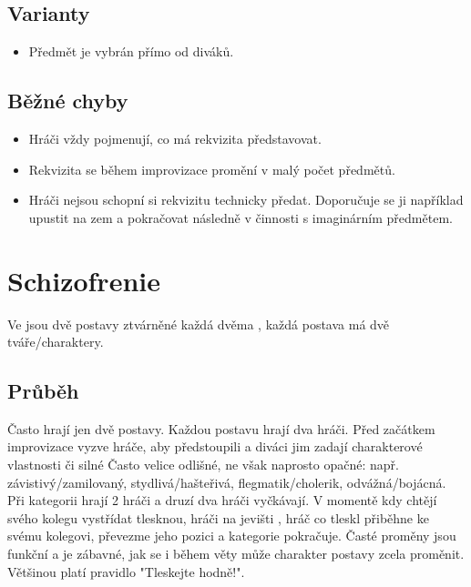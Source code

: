 \subsection{ Varianty } \begin{itemize}
\item Předmět je vybrán přímo od diváků.
\end{itemize}
 
\subsection{ Běžné chyby } \begin{itemize}
\item Hráči vždy pojmenují, co má rekvizita představovat.
\item Rekvizita se během improvizace promění v malý počet předmětů.
\item Hráči nejsou schopní si rekvizitu technicky předat. Doporučuje se ji například upustit na zem a pokračovat následně v činnosti s imaginárním předmětem.
\end{itemize}
 
 
 
 
\needspace{5cm} \section{Schizofrenie} \label{schizofrenie}  
 
Ve  jsou dvě postavy ztvárněné každá dvěma , každá postava má dvě tváře/charaktery. 
 
\subsection{ Průběh } Často hrají jen dvě postavy. Každou postavu hrají dva hráči. Před začátkem improvizace vyzve  hráče, aby předstoupili a diváci jim zadají charakterové vlastnosti či silné  Často velice odlišné, ne však naprosto opačné: např. závistivý/zamilovaný, stydlivá/hašteřivá, flegmatik/cholerik, odvážná/bojácná. 
Při kategorii hrají 2 hráči a druzí dva hráči vyčkávají. V momentě kdy chtějí svého kolegu vystřídat tlesknou, hráči na jevišti , hráč co tleskl přiběhne ke svému kolegovi, převezme jeho pozici a kategorie pokračuje. Časté proměny jsou funkční a je zábavné, jak se i během věty může charakter postavy zcela proměnit. Většinou platí pravidlo "Tleskejte hodně!". 
 
